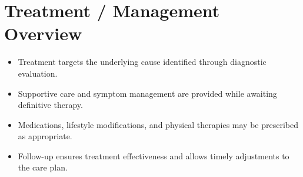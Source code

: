 \section*{Treatment / Management Overview}
\begin{itemize}
  \item Treatment targets the underlying cause identified through diagnostic evaluation.
  \item Supportive care and symptom management are provided while awaiting definitive therapy.
  \item Medications, lifestyle modifications, and physical therapies may be prescribed as appropriate.
  \item Follow-up ensures treatment effectiveness and allows timely adjustments to the care plan.
\end{itemize}

\clearpage